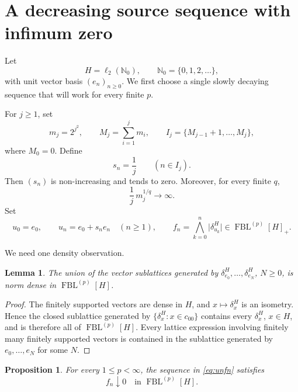 \documentclass[11pt]{article}
\newtheorem{proposition}[theorem]{Proposition}
\newtheorem{lemma}[theorem]{Lemma}
\theoremstyle{remark}
\newcommand{\FBL}[2]{\operatorname{FBL}^{(#1)}[#2]}
\newcommand{\N}{\mathbb{N}}
\newcommand{\abs}[1]{\lvert #1\rvert}
\begin{document}
\section{A decreasing source sequence with infimum zero}

Let
\[
  H=\ell_2(\N_0),
  \qquad \N_0=\{0,1,2,\ldots\},
\]
with unit vector basis \((e_n)_{n\ge0}\).  We first choose a single slowly
decaying sequence that will work for every finite \(p\).

For \(j\ge1\), set
\[
  m_j=2^{j^2},
  \qquad
  M_j=\sum_{i=1}^j m_i,
  \qquad
  I_j=\{M_{j-1}+1,\ldots,M_j\},
\]
where \(M_0=0\).  Define
\begin{equation}\label{eq:sndef}
  s_n=\frac1j \qquad(n\in I_j).
\end{equation}
Then \((s_n)\) is non-increasing and tends to zero.  Moreover, for every
finite \(q\),
\begin{equation}\label{eq:blockgrowth}
  \frac1j\,m_j^{1/q}\longrightarrow\infty.
\end{equation}
Set
\begin{equation}\label{eq:unfn}
  u_0=e_0,
  \qquad
  u_n=e_0+s_ne_n\quad(n\ge1),
  \qquad
  f_n=\bigwedge_{k=0}^n\abs{\delta_{u_k}^H}
       \in\FBL{p}{H}_+.
\end{equation}

We need one density observation.

\begin{lemma}\label{lem:finite-density}
The union of the vector sublattices generated by
\(\delta_{e_0}^H,\ldots,\delta_{e_N}^H\), \(N\ge0\), is norm dense in
\(\FBL{p}{H}\).
\end{lemma}

\begin{proof}
The finitely supported vectors are dense in \(H\), and
\(x\mapsto\delta_x^H\) is an isometry.  Hence the closed sublattice generated
by \(\{\delta_x^H:x\in c_{00}\}\) contains every \(\delta_x^H\),
\(x\in H\), and is therefore all of \(\FBL{p}{H}\).  Every lattice
expression involving finitely many finitely supported vectors is contained in
the sublattice generated by \(e_0,\ldots,e_N\) for some \(N\).
\end{proof}

\begin{proposition}\label{prop:source-zero}
For every \(1\le p<\infty\), the sequence in \eqref{eq:unfn} satisfies
\[
  f_n\downarrow0 \quad\text{in }\FBL{p}{H}.
\]
\end{proposition}
\end{document}

